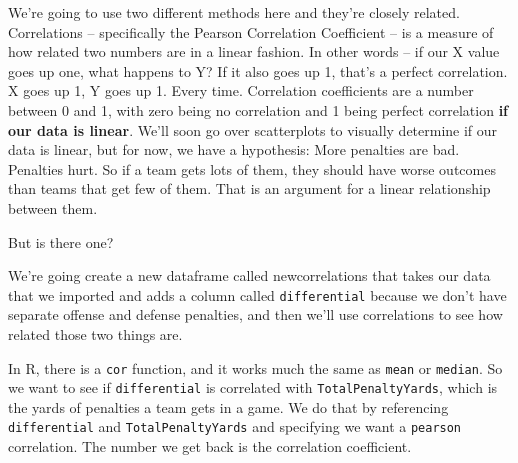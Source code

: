 \documentclass[
]{book}
\newenvironment{Shaded}{\begin{snugshade}}{\end{snugshade}}
\newcommand{\DataTypeTok}[1]{\textcolor[rgb]{0.13,0.29,0.53}{#1}}
\newcommand{\KeywordTok}[1]{\textcolor[rgb]{0.13,0.29,0.53}{\textbf{#1}}}
\newcommand{\NormalTok}[1]{#1}
\newcommand{\OperatorTok}[1]{\textcolor[rgb]{0.81,0.36,0.00}{\textbf{#1}}}
\newcommand{\StringTok}[1]{\textcolor[rgb]{0.31,0.60,0.02}{#1}}
\begin{document}
We're going to use two different methods here and they're closely related. Correlations -- specifically the Pearson Correlation Coefficient -- is a measure of how related two numbers are in a linear fashion. In other words -- if our X value goes up one, what happens to Y? If it also goes up 1, that's a perfect correlation. X goes up 1, Y goes up 1. Every time. Correlation coefficients are a number between 0 and 1, with zero being no correlation and 1 being perfect correlation \textbf{if our data is linear}. We'll soon go over scatterplots to visually determine if our data is linear, but for now, we have a hypothesis: More penalties are bad. Penalties hurt. So if a team gets lots of them, they should have worse outcomes than teams that get few of them. That is an argument for a linear relationship between them.

But is there one?

We're going create a new dataframe called newcorrelations that takes our data that we imported and adds a column called \texttt{differential} because we don't have separate offense and defense penalties, and then we'll use correlations to see how related those two things are.

\begin{Shaded}
\end{Shaded}

In R, there is a \texttt{cor} function, and it works much the same as \texttt{mean} or \texttt{median}. So we want to see if \texttt{differential} is correlated with \texttt{TotalPenaltyYards}, which is the yards of penalties a team gets in a game. We do that by referencing \texttt{differential} and \texttt{TotalPenaltyYards} and specifying we want a \texttt{pearson} correlation. The number we get back is the correlation coefficient.

\begin{Shaded}
\end{Shaded}
\end{document}
